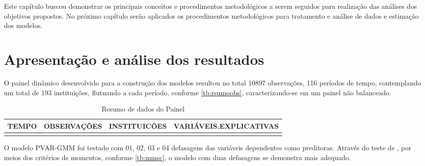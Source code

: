 \documentclass[
  12pt,
  12pt,
  openright,
  oneside,
  a4paper,
  chapter=TITLE,
  section=TITLE,
  subsection=TITLE,
  subsubsection=TITLE,
  english,
  portugues,
  sumario=tradicional]{abntex2}
\begin{document}
Este capítulo buscou demonstrar os principais conceitos e procedimentos metodológicos a serem seguidos para realização das análises dos objetivos propostos. No próximo capítulo serão aplicados os procedimentos metodológicos para tratamento e análise de dados e estimação dos modelos.

\textual
\pagestyle{simple}
\parindent 1.50cm

\chapter{Apresentação e análise dos resultados}

O painel dinâmico desenvolvido para a construção dos modelos resultou no total 10897 observações, 116 períodos de tempo, contemplando um total de 193 instituições, flutuando a cada período, conforme \autoref{tb:rsumoobs}, caracterizando-se em um painel não balanceado.

\begin{table}[!h]
\caption{Resumo de dados do Painel}
\begingroup\fontsize{10}{12}\selectfont

\begin{tabu} to 
\toprule
TEMPO & OBSERVAÇÕES & INSTITUICÕES & VARIÁVEIS.EXPLICATIVAS\\
\midrule
{} &  &  & \\
\bottomrule
\end{tabu}
\endgroup{}
\label{tb:rsumoobs}
\end{table}

O modelo PVAR-GMM foi testado com 01, 02, 03 e 04 defasagens das variáveis dependentes como preditoras. Através do teste de \textcite{andrews-lu:2001}, por meios dos critérios de momentos, conforme \autoref{tb:mmsc}, o modelo com duas defasagens se demonstra mais adequado.
\end{document}
